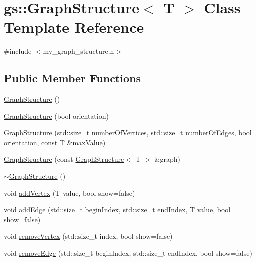 \hypertarget{classgs_1_1_graph_structure}{}\section{gs\+:\+:Graph\+Structure$<$ T $>$ Class Template Reference}
\label{classgs_1_1_graph_structure}


{\ttfamily \#include $<$my\+\_\+graph\+\_\+structure.\+h$>$}

\subsection*{Public Member Functions}
\begin{DoxyCompactItemize}
\item 
\mbox{\hyperlink{classgs_1_1_graph_structure_a5a816a9d12685c2c429958131cd950a6}{Graph\+Structure}} ()
\item 
\mbox{\hyperlink{classgs_1_1_graph_structure_aba14df4f7f6e35d54f27d69145603cd5}{Graph\+Structure}} (bool orientation)
\item 
\mbox{\hyperlink{classgs_1_1_graph_structure_a7b2ccfb7dfad4317cad69b4296a20173}{Graph\+Structure}} (std\+::size\+\_\+t number\+Of\+Vertices, std\+::size\+\_\+t number\+Of\+Edges, bool orientation, const T \&max\+Value)
\item 
\mbox{\hyperlink{classgs_1_1_graph_structure_a30f102d272103f65b86945164bd99e0e}{Graph\+Structure}} (const \mbox{\hyperlink{classgs_1_1_graph_structure}{Graph\+Structure}}$<$ T $>$ \&graph)
\item 
\mbox{\hyperlink{classgs_1_1_graph_structure_aadb408a61239261f483de8d603263475}{$\sim$\+Graph\+Structure}} ()
\item 
void \mbox{\hyperlink{classgs_1_1_graph_structure_a6cb3d7466f0d5e3887203a70caef9864}{add\+Vertex}} (T value, bool show=false)
\item 
void \mbox{\hyperlink{classgs_1_1_graph_structure_aa6f1f886901df25493fd5ecb582c9196}{add\+Edge}} (std\+::size\+\_\+t begin\+Index, std\+::size\+\_\+t end\+Index, T value, bool show=false)
\item 
void \mbox{\hyperlink{classgs_1_1_graph_structure_a3ce672fa2de3985fba1d1111efad2878}{remove\+Vertex}} (std\+::size\+\_\+t index, bool show=false)
\item 
void \mbox{\hyperlink{classgs_1_1_graph_structure_aa27a2bd0421823f44ac670b691cedcbd}{remove\+Edge}} (std\+::size\+\_\+t begin\+Index, std\+::size\+\_\+t end\+Index, bool show=false)
\item 

\end{DoxyCompactItemize}
